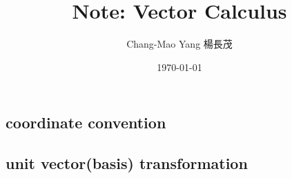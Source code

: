 \documentclass[12pt]{article}
\title{Note: Vector Calculus}
\date{\today}
\author{Chang-Mao Yang 楊長茂}
\begin{document}
\maketitle

\subsection{coordinate convention}
\begin{figure}[htp]

\end{figure}



\subsection{unit vector(basis) transformation}
\end{document}
